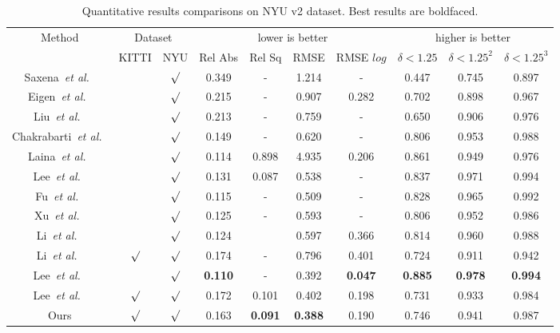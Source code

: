 \documentclass{svjour3}                     %
\begin{document}
\begin{table}[h]
  \centering
  \caption{Quantitative results comparisons on NYU v2 dataset.
  Best results are boldfaced.}
  \label{tab:nyu quantitative result}
  \begin{tabular}{c|cc|cccc|ccc}
    \toprule
    \multirow{2}{*}{Method} & \multicolumn{2}{c|}{Dataset}& \multicolumn{4}{c}{lower is better}&\multicolumn{3}{|c}{higher is better}\\
    &KITTI&NYU& Rel Abs & Rel Sq & RMSE& RMSE $log$ &$\delta<1.25$ &$\delta<1.25^2$ & $\delta<1.25^3$ \\   
    \midrule
    Saxena~\textit{et al.}~\cite{Make3D}&&$\surd $&0.349&-&
    1.214&-&0.447&0.745&0.897\\
    Eigen~\textit{et al.}~\cite{eigen2014depth}&&$\surd$&0.215&-
    &0.907&0.282&0.702&0.898&0.967\\
    Liu~\textit{et al.}~\cite{liu2015learning}&&$\surd$&0.213&-&0.759&-&0.650&0.906&0.976\\
    Chakrabarti~\textit{et al.}~\cite{chakrabarti2016depth}&&$\surd$&0.149&-&0.620&-&0.806&0.953&0.988\\
    Laina~\textit{et al.}~\cite{laina2016deeper}&&$\surd$&0.114&0.898&4.935&0.206&0.861&0.949&0.976\\
    Lee~\textit{et al.}~\cite{lee2019monocular}&&$\surd$&
    0.131&0.087&0.538&-&0.837&0.971&0.994\\
    Fu~\textit{et al.}~\cite{FuCVPR18-DORN}&&$\surd$&0.115&-&0.509&-&0.828&0.965&0.992\\
    Xu~\textit{et al.}~\cite{xu2018structured}&&$\surd$&0.125&-&0.593&-&0.806&0.952&0.986\\
    \hline
    Li~\textit{et al.}~\cite{DABC}&&$\surd$&0.124&&0.597&0.366&0.814&0.960&0.988\\
    Li~\textit{et al.}~\cite{DABC}&$\surd$&$\surd$&0.174&-&0.796&0.401&0.724&0.911&0.942\\
    \hline
    Lee~\textit{et al.}~\cite{bts}&&$\surd$&\textbf{0.110}&-&0.392&\textbf{0.047}&\textbf{0.885}&\textbf{0.978}&\textbf{0.994}\\
    Lee~\textit{et al.}~\cite{bts}&$\surd$&$\surd$&0.172&0.101&0.402&0.198&0.731&0.933&0.984\\
    Ours&$\surd$&$\surd$&0.163&\textbf{0.091}&\textbf{0.388}&0.190&0.746&0.941&0.987\\
    \bottomrule
  \end{tabular}
\end{table}
\end{document}
